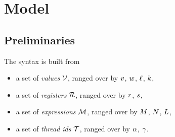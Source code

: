 
\section{Model}
\label{sec:model}

\subsection{Preliminaries}
\label{sec:prelim}
The syntax is built from
\begin{itemize}
\item a set of \emph{values} $\mathcal{V}$, ranged over by
  $v$, $w$, $\ell$, $k$,
\item a set of \emph{registers} $\mathcal{R}$, ranged over by
  $r$, $s$,
\item a set of \emph{expressions} $\mathcal{M}$, ranged over by
  $M$, $N$,  $L$,
\item a set of \emph{thread ids} $\mathcal{T}$, ranged over by
  $\alpha$, $\gamma$.
\end{itemize}

